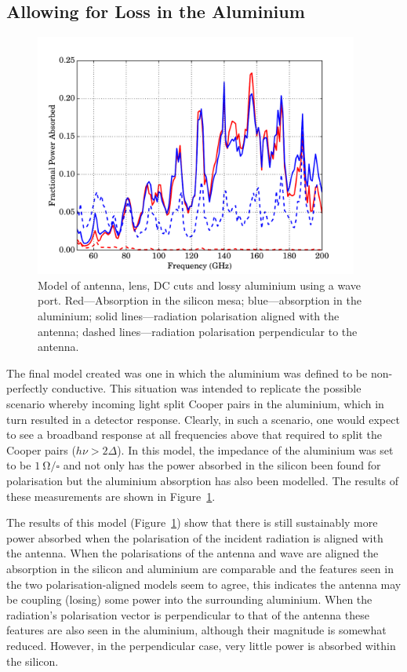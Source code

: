 \subsection{Allowing for Loss in the Aluminium}\label{ssec:antennaSims_full}
\begin{figure}[tb]
\begin{center}
\includegraphics[width = 0.95\textwidth]{figures/antennaSim_full}
\caption[Model of antenna, lens, DC cuts and lossy aluminium using a wave port]{Model of antenna, lens, DC cuts and lossy aluminium using a wave port. Red---Absorption in the silicon mesa; blue---absorption in the aluminium; solid lines---radiation polarisation aligned with the antenna; dashed lines---radiation polarisation perpendicular to the antenna.}
\label{fig:antennaSims_full}
\end{center}
\end{figure}
The final model created was one in which the aluminium was defined to be non-perfectly conductive. This situation was intended to replicate the possible scenario whereby incoming light split Cooper pairs in the aluminium, which in turn resulted in a detector response. Clearly, in such a scenario, one would expect to see a broadband response at all frequencies above that required to split the Cooper pairs ($h\nu > 2\varDelta$). In this model, the impedance of the aluminium was set to be $1~\mathrm{\Omega/\square}$ and not only has the power absorbed in the silicon been found for polarisation but the aluminium absorption has also been modelled. The results of these measurements are shown in Figure~\ref{fig:antennaSims_full}.
\par
The results of this model (Figure~\ref{fig:antennaSims_full}) show that there is still sustainably more power absorbed when the polarisation of the incident radiation is aligned with the antenna. When the polarisations of the antenna and wave are aligned the absorption in the silicon and aluminium are comparable and the features seen in the two polarisation-aligned models seem to agree, this indicates the antenna may be coupling (losing) some power into the surrounding aluminium. When the radiation's polarisation vector is perpendicular to that of the antenna these features are also seen in the aluminium, although their magnitude is somewhat reduced. However, in the perpendicular case, very little power is absorbed within the silicon.
%

